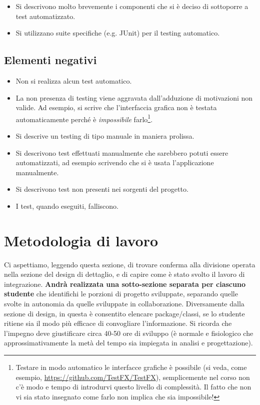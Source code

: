 \documentclass[a4paper,12pt]{report}
\begin{document}
\begin{itemize}
	\item Si descrivono molto brevemente i componenti che si è deciso di sottoporre a test automatizzato.
	\item Si utilizzano suite specifiche (e.g. JUnit) per il testing automatico.
\end{itemize}

\subsection*{Elementi negativi}
\begin{itemize}
	\item Non si realizza alcun test automatico.
	\item La non presenza di testing viene aggravata dall'adduzione di motivazioni non valide. Ad esempio, si scrive che l'interfaccia grafica non è testata automaticamente perché è \emph{impossibile} farlo\footnote{Testare in modo automatico le interfacce grafiche è possibile (si veda, come esempio, \url{https://github.com/TestFX/TestFX}), semplicemente nel corso non c'è modo e tempo di introdurvi questo livello di complessità. Il fatto che non vi sia stato insegnato come farlo non implica che sia impossibile!}.
	\item Si descrive un testing di tipo manuale in maniera prolissa.
	\item Si descrivono test effettuati manualmente che sarebbero potuti essere automatizzati, ad esempio scrivendo che si è usata l'applicazione manualmente.
	\item Si descrivono test non presenti nei sorgenti del progetto.
	\item I test, quando eseguiti, falliscono.
\end{itemize}

\section{Metodologia di lavoro}

Ci aspettiamo, leggendo questa sezione, di trovare conferma alla divisione operata nella sezione del design di dettaglio, e di capire come è stato svolto il lavoro di integrazione.
%
\textbf{Andrà realizzata una sotto-sezione separata per ciascuno studente} che identifichi le porzioni di progetto sviluppate, separando quelle svolte in autonomia da quelle sviluppate in collaborazione.
%
Diversamente dalla sezione di design, in questa è consentito elencare package/classi, se lo studente ritiene sia il modo più efficace di convogliare l'informazione.
%
Si ricorda che l'impegno deve giustificare circa 40-50 ore di sviluppo (è normale e fisiologico che approssimativamente la metà del tempo sia impiegata in analisi e progettazione).
\end{document}
